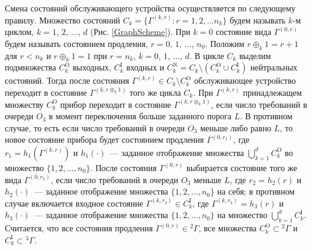 \documentclass[a4paper,12pt,russian]{extarticle}
\newcommand{\G}{\Gamma}
\newcommand{\ga}[1]{\Gamma^{\left( #1 \right)} }
\begin{document}
Смена состояний обслуживающего устройства осуществляется по следующему правилу. Множество состояний $C_k = \{\G^{(k,r)} \colon r=1,2,\ldots n_k\}$ будем называть $k$-м циклом, $k=1$, $2$, $\ldots$, $d$ (Рис. \ref{GraphScheme}). При $k=0$ состояние вида $\ga{0,r}$ будем называть состоянием продления, $r=0$, $1$, $\ldots$, $n_0$. Положим $r \oplus_k 1 = r+1$ для $r<n_k$ и $r \oplus_k 1 = 1$ при $r=n_k$, $k = 0$, $1$, $\ldots$, $d$. В цикле $C_k$ выделим подмножества $C_k^{\mathrm{O}}$ выходных, $C_k^{\mathrm{I}}$ входных и $C_k^{\mathrm{N}} = C_k \setminus (C_k^{\mathrm{O}} \cup C_k^{\mathrm{I}})$ нейтральных состояний. Тогда после состояния $\ga{k,r} \in C_k\setminus C_k^{\mathrm{O}}$ обслуживающее устройство переходит в состояние $\ga{k,r \oplus_k 1}$ того же цикла $C_k$. При $\ga{k,r}$ принадлежащем множеству $C_k^{\mathrm{O}}$ прибор переходит в состояние $\ga{k,r\oplus_k 1}$, если число требований в очереди $O_3$ в момент переключения больше заданного порога $L$. В противном случае, то есть если число требований в очереди $O_3$ меньше либо равно $L$, то новое состояние прибора будет состоянием продления $\ga{0,r_1}$, где $r_1=h_1(\ga{k,r})$ и $h_1(\cdot)$~--- заданное отображение множества $\bigcup\limits_{k=1}^d C_k^{\mathrm{O}}$ во множество $\{1,2,\ldots, n_0\}$. После состояния $\ga{0,r}$ выбирается состояние того же вида $\ga{0,r_2}$, если число требований в очереди $O_3$ меньше $L$, где $r_2=h_2(r)$ и $h_2(\cdot)$~--- заданное отображение множества $\{1,2, \ldots, n_0\}$ на себя; в противном случае включается входное состояние $\ga{k,r_3} \in C_k^{\mathrm{I}}$, где $\ga{k,r_3}=h_3(r)$ и $h_3(\cdot)$~--- заданное отображение множества $\{1,2, \ldots, n_0\}$ на множество  $\bigcup\limits_{k=1}^d C_k^{\mathrm{I}}$. Считается, что все состояния продления $\ga{0,r} \in {}^2 \G$, все множества $C_k^\mathrm{O}\subset {}^2 \G$ и $C_k^\mathrm{I}\subset {}^3 \G$.
\end{document}
